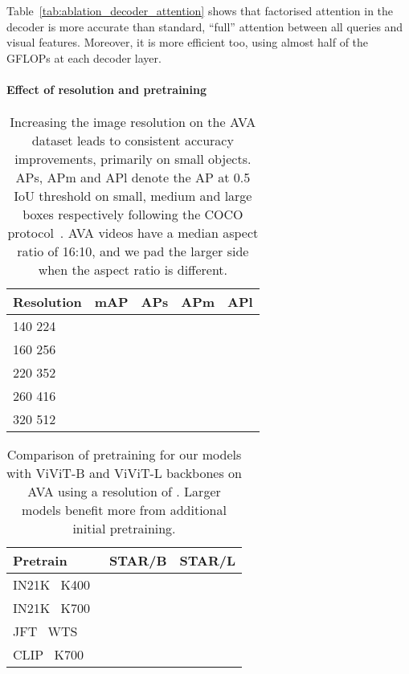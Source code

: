 \documentclass[10pt,twocolumn,letterpaper]{article}
\def \paravspace {-0.7\baselineskip}
\begin{document}
Table~\ref{tab:ablation_decoder_attention} shows that factorised attention in the decoder is more accurate than standard, ``full'' attention between all queries and visual features.
Moreover, it is more efficient too, using almost half of the GFLOPs at each decoder layer.

\vspace{\paravspace}
\paragraph{Effect of resolution and pretraining}


\begin{table}[t]
    \centering
    \caption{
    Increasing the image resolution on the AVA dataset leads to consistent accuracy improvements, primarily on small objects.
    APs, APm and APl denote the AP at 0.5 IoU threshold on small, medium and large boxes respectively following the COCO protocol~\cite{lin_coco_eccv_2014}.
    AVA videos have a median aspect ratio of 16:10, and we pad the larger side when the aspect ratio is different.
    }
    \begin{tabular}{lcccc}
    \toprule
    Resolution                 & mAP  & APs & APm & APl \\  \midrule
    140  224           &   &  &   &  \\
    160  256           &   &  &  &  \\ 220  352           &   &  &  &  \\
    260  416           &   &  &  &  \\
    320  512           &   &  &  &  \\  \bottomrule
    \end{tabular}
    \label{tab:ablation_resolution}
    \vspace{-0.5\baselineskip}
\end{table}
     \begin{table}[t]
\centering
\caption{
	Comparison of pretraining for our models with ViViT-B and ViViT-L backbones on AVA using a resolution of .
    Larger models benefit more from additional initial pretraining.
}
\begin{tabular}{lcc}
\toprule
Pretrain                 & STAR/B & STAR/L \\





\midrule

IN21K~\cite{deng_cvpr_2009}  K400~\cite{kay_arxiv_2017}         &     &    \\  IN21K~\cite{deng_cvpr_2009}  K700~\cite{carreira2019short}         &    &     \\  JFT~\cite{sun_iccv_2017}  WTS~\cite{stroud2020learning}          &     &    \\  CLIP~\cite{radford2021learning}  K700~\cite{carreira2019short}          &    &    \\  

\bottomrule
\end{tabular}
\label{tab:ablation_pretraining}
\vspace{-1.25\baselineskip}
\end{table}
 
\end{document}
